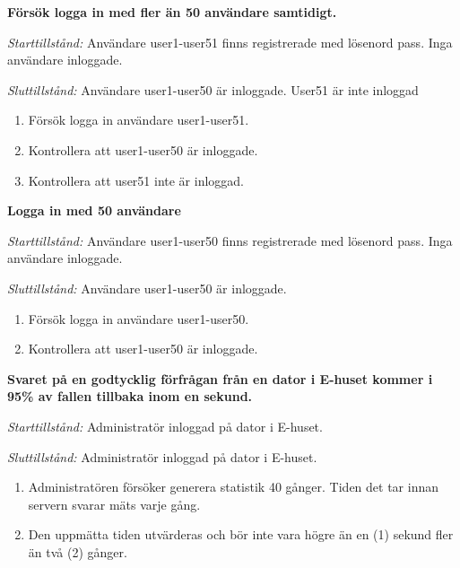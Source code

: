 \documentclass[a4paper]{article}
\begin{document}
\begin{ST}
\item
\textbf{Försök logga in med fler än 50 användare samtidigt.}

\emph{Starttillstånd:} Användare user1-user51 finns registrerade med lösenord pass. Inga användare inloggade.

\emph{Sluttillstånd:} Användare user1-user50 är inloggade. User51 är inte inloggad

\begin{enumerate}

\item
Försök logga in användare user1-user51.
\item
Kontrollera att user1-user50 är inloggade.
\item
Kontrollera att user51 inte är inloggad.
\end{enumerate}

\item
\textbf{Logga in med 50 användare}

\emph{Starttillstånd:} Användare user1-user50 finns registrerade med lösenord pass. Inga användare inloggade.

\emph{Sluttillstånd:} Användare user1-user50 är inloggade.

\begin{enumerate}

\item
Försök logga in användare user1-user50.
\item
Kontrollera att user1-user50 är inloggade.
\end{enumerate}



\item
\textbf{Svaret på en godtycklig förfrågan från en dator i E-huset kommer i 95\% av fallen tillbaka
inom en sekund.}

\emph{Starttillstånd:} Administratör inloggad på dator i E-huset.

\emph{Sluttillstånd:} Administratör inloggad på dator i E-huset.

\begin{enumerate}

\item Administratören försöker generera statistik 40 gånger. Tiden det tar innan servern svarar mäts varje gång.

\item Den uppmätta tiden utvärderas och bör inte vara högre än en (1) sekund fler än två (2) gånger.


\end{enumerate}

\end{ST}
\end{document}
